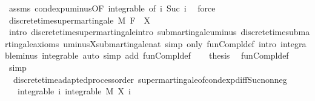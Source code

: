 \begin{isabellebody}
\ assms{\isacharparenleft}{\kern0pt}{}{\isacharparenright}{\kern0pt}\ cond{\isacharunderscore}{\kern0pt}exp{\isacharunderscore}{\kern0pt}uminus{\isacharbrackleft}{\kern0pt}OF\ integrable{\isacharcomma}{\kern0pt}\ of\ i\ {\isachardoublequoteopen}Suc\ i{\isachardoublequoteclose}{\isacharbrackright}{\kern0pt}\ \isamarkupfalse%
\ force\isanewline
\ \ \isamarkupfalse%
\ {\isachardoublequoteopen}discrete{\isacharunderscore}{\kern0pt}time{\isacharunderscore}{\kern0pt}supermartingale\ M\ F\ {\isacharparenleft}{\kern0pt}{\isacharminus}{\kern0pt}{\isacharparenleft}{\kern0pt}{\isacharminus}{\kern0pt}\ X{\isacharparenright}{\kern0pt}{\isacharparenright}{\kern0pt}{\isachardoublequoteclose}\ \isamarkupfalse%
\ {\isacharparenleft}{\kern0pt}intro\ discrete{\isacharunderscore}{\kern0pt}time{\isacharunderscore}{\kern0pt}supermartingale{\isachardot}{\kern0pt}intro\ submartingale{\isachardot}{\kern0pt}uminus\ discrete{\isacharunderscore}{\kern0pt}time{\isacharunderscore}{\kern0pt}submartingale{\isachardot}{\kern0pt}axioms\ uminus{\isacharunderscore}{\kern0pt}X{\isachardot}{\kern0pt}submartingale{\isacharunderscore}{\kern0pt}nat{\isacharparenright}{\kern0pt}\ {\isacharparenleft}{\kern0pt}simp\ only{\isacharcolon}{\kern0pt}\ fun{\isacharunderscore}{\kern0pt}Compl{\isacharunderscore}{\kern0pt}def{\isacharcomma}{\kern0pt}\ intro\ integrable{\isacharunderscore}{\kern0pt}minus\ integrable{\isacharcomma}{\kern0pt}\ auto\ simp\ add{\isacharcolon}{\kern0pt}\ fun{\isacharunderscore}{\kern0pt}Compl{\isacharunderscore}{\kern0pt}def{\isacharparenright}{\kern0pt}\isanewline
\ \ \isamarkupfalse%
\ {\isacharquery}{\kern0pt}thesis\ \isamarkupfalse%
\ fun{\isacharunderscore}{\kern0pt}Compl{\isacharunderscore}{\kern0pt}def\ \isamarkupfalse%
\ simp\isanewline
{}\isamarkupfalse%
%
\endisatagproof
{\isafoldproof}%
%
\isadelimproof
\isanewline
%
\endisadelimproof
\isanewline
{}\isamarkupfalse%
\ {\isacharparenleft}{\kern0pt}\ discrete{\isacharunderscore}{\kern0pt}time{\isacharunderscore}{\kern0pt}adapted{\isacharunderscore}{\kern0pt}process{\isacharunderscore}{\kern0pt}order{\isacharparenright}{\kern0pt}\ supermartingale{\isacharunderscore}{\kern0pt}of{\isacharunderscore}{\kern0pt}cond{\isacharunderscore}{\kern0pt}exp{\isacharunderscore}{\kern0pt}diff{\isacharunderscore}{\kern0pt}Suc{\isacharunderscore}{\kern0pt}nonneg{\isacharcolon}{\kern0pt}\isanewline
\ \ \ integrable{\isacharcolon}{\kern0pt}\ {\isachardoublequoteopen}{\isasymAnd}i{\isachardot}{\kern0pt}\ integrable\ M\ {\isacharparenleft}{\kern0pt}X\ i{\isacharparenright}{\kern0pt}{\isachardoublequoteclose}\ \isanewline

\end{isabellebody}

